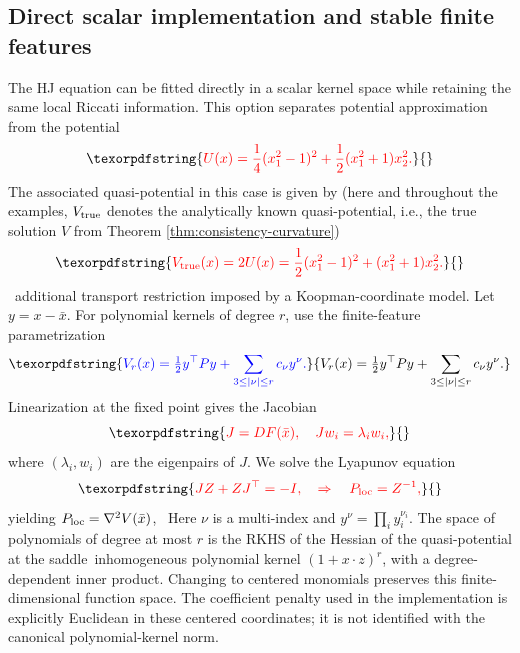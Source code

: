 \documentclass[11pt]{article}
\theoremstyle{plain}      %
\theoremstyle{definition} %
\providecommand{\DIFaddtex}[1]{{\protect\color{blue}#1}} %
\providecommand{\DIFdeltex}[1]{{\protect\color{red}#1}} %
\providecommand{\DIFaddbegin}{} %
\providecommand{\DIFaddend}{} %
\providecommand{\DIFdelbegin}{} %
\providecommand{\DIFdelend}{} %
\providecommand{\DIFadd}[1]{\texorpdfstring{\DIFaddtex{#1}}{#1}} %
\providecommand{\DIFdel}[1]{\texorpdfstring{\DIFdeltex{#1}}{}} %
\newcommand{\DIFscaledelfig}{1.0}
\newlength{\DIFdelgraphicswidth} %
\newlength{\DIFdelgraphicsheight} %
\newcommand{\DIFaddincludegraphics}[2][]{{\color{blue}\fbox{\DIFOincludegraphics[#1]{#2}}}} %
\newcommand{\DIFdelincludegraphics}[2][]{%
\sbox{\DIFdelgraphicsbox}{\DIFOincludegraphics[#1]{#2}}%
\settoboxwidth{\DIFdelgraphicswidth}{\DIFdelgraphicsbox} %
\settoboxtotalheight{\DIFdelgraphicsheight}{\DIFdelgraphicsbox} %
\scalebox{\DIFscaledelfig}{%
\parbox[b]{\DIFdelgraphicswidth}{\usebox{\DIFdelgraphicsbox}\\[-\baselineskip] \rule{\DIFdelgraphicswidth}{0em}}\llap{\resizebox{\DIFdelgraphicswidth}{\DIFdelgraphicsheight}{%
\setlength{\unitlength}{\DIFdelgraphicswidth}%
\begin{picture}(1,1)%
\thicklines\linethickness{2pt} %
{\color[rgb]{1,0,0}\put(0,0){\framebox(1,1){}}}%
{\color[rgb]{1,0,0}\put(0,0){\line( 1,1){1}}}%
{\color[rgb]{1,0,0}\put(0,1){\line(1,-1){1}}}%
\end{picture}%
}\hspace*{3pt}}} %
} %
\DeclareRobustCommand{\DIFaddbegin}{\DIFOaddbegin \let\includegraphics\DIFaddincludegraphics} %
\DeclareRobustCommand{\DIFaddend}{\DIFOaddend \let\includegraphics\DIFOincludegraphics} %
\DeclareRobustCommand{\DIFdelbegin}{\DIFOdelbegin \let\includegraphics\DIFdelincludegraphics} %
\DeclareRobustCommand{\DIFdelend}{\DIFOaddend \let\includegraphics\DIFOincludegraphics} %
\begin{document}
\subsection{\DIFadd{Direct scalar implementation and stable finite features}}\label{sec:direct-implementation}
\DIFadd{The HJ equation can be fitted directly in a scalar kernel space while retaining the same local Riccati information. This option separates potential approximation from }\DIFaddend the \DIFdelbegin \DIFdel{potential
}\[
\DIFdel{U(x) = \frac{1}{4} (x_1^2 - 1)^2 + \frac{1}{2} (x_1^2 + 1)x_2^2.
}\]%
\DIFdel{The associated quasi-potential in this case is given by (here and throughout the examples, $V_{\rm true}$ denotes the analytically known quasi-potential, i.e., the true solution $V$ from Theorem \ref{thm:consistency-curvature})
}\[
\DIFdel{V_{\rm true}(x) = 2U(x) = \frac{1}{2} (x_1^2 - 1)^2 + (x_1^2 + 1)x_2^2.
}\]%
\DIFdelend\ \DIFaddbegin \DIFadd{additional transport restriction imposed by a Koopman-coordinate model. Let $y=x-\bar x$. For polynomial kernels of degree $r$, use the finite-feature parametrization
}\begin{equation}\DIFadd{\label{eq:direct-polynomial}
 V_r(x)=\tfrac12y^\top Py+\sum_{3\leq|\nu|\leq r}c_\nu y^\nu.
}\end{equation}\DIFaddend 
\DIFdelbegin \DIFdel{Linearization at the fixed point gives the Jacobian
}\[
\DIFdel{J = D F(\bar{x}), \quad J w_i = \lambda_i w_i,
}\]%
\DIFdel{where \( (\lambda_i, w_i) \) are the eigenpairs of \( J \). We solve the Lyapunov equation
}\[
\DIFdel{J Z + Z J^\top = -I, \quad \Rightarrow \quad P_{\rm loc} = Z^{-1},
}\]%
\DIFdel{yielding \( P_{\rm loc} = \nabla^2 V(\bar{x}) \), }\DIFdelend\ \DIFaddbegin \DIFadd{Here $\nu$ is a multi-index and $y^\nu=\prod_i y_i^{\nu_i}$. The space of polynomials of degree at most $r$ is the RKHS of }\DIFaddend the \DIFdelbegin \DIFdel{Hessian of the quasi-potential at the saddle}\DIFdelend\ \DIFaddbegin \DIFadd{inhomogeneous polynomial kernel $(1+x\cdot z)^r$, with a degree-dependent inner product. Changing to centered monomials preserves this finite-dimensional function space. The coefficient penalty used in the implementation is explicitly Euclidean in these centered coordinates; it is not identified with the canonical polynomial-kernel norm}\DIFaddend .
\end{document}
